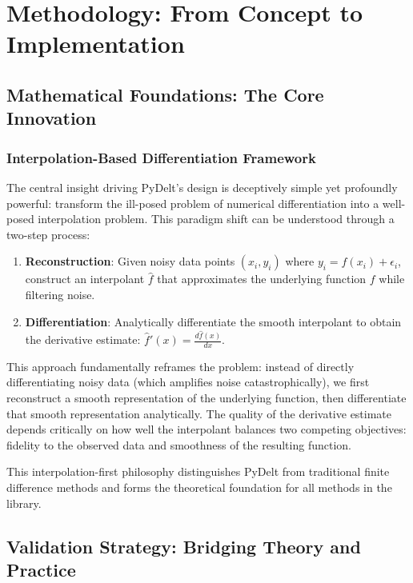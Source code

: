 \documentclass[10pt,journal,compsoc]{IEEEtran}
\begin{document}
\section{Methodology: From Concept to Implementation}

\subsection{Mathematical Foundations: The Core Innovation}

\subsubsection{Interpolation-Based Differentiation Framework}

The central insight driving PyDelt's design is deceptively simple yet profoundly powerful: transform the ill-posed problem of numerical differentiation into a well-posed interpolation problem. This paradigm shift can be understood through a two-step process:

\begin{enumerate}
    \item \textbf{Reconstruction}: Given noisy data points $(x_i, y_i)$ where $y_i = f(x_i) + \epsilon_i$, construct an interpolant $\hat{f}$ that approximates the underlying function $f$ while filtering noise.
    
    \item \textbf{Differentiation}: Analytically differentiate the smooth interpolant to obtain the derivative estimate: $\hat{f}'(x) = \frac{d\hat{f}(x)}{dx}$.
\end{enumerate}

This approach fundamentally reframes the problem: instead of directly differentiating noisy data (which amplifies noise catastrophically), we first reconstruct a smooth representation of the underlying function, then differentiate that smooth representation analytically. The quality of the derivative estimate depends critically on how well the interpolant balances two competing objectives: fidelity to the observed data and smoothness of the resulting function.

This interpolation-first philosophy distinguishes PyDelt from traditional finite difference methods and forms the theoretical foundation for all methods in the library.

\subsection{Validation Strategy: Bridging Theory and Practice}
\end{document}
